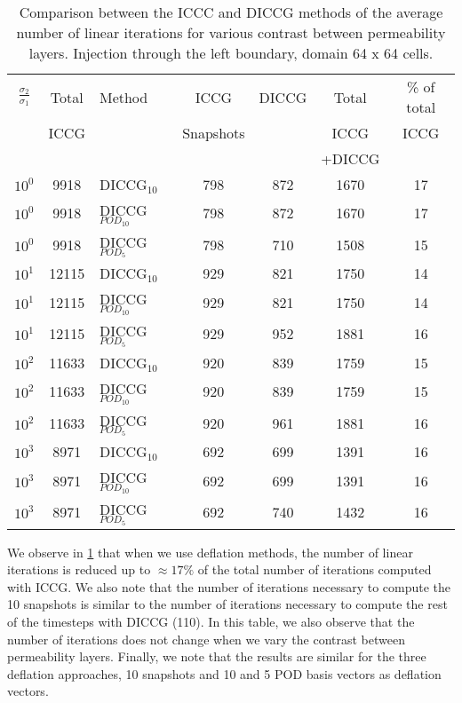 \documentclass[12pt]{article}
\begin{document}
\begin{table}[!h]\centering
\begin{minipage}{1\textwidth}
 \centering
\begin{tabular}{ ||c|c||l|c|c|c|c||} 
\hline
$\frac{\sigma_2}{\sigma_1}$&Total&Method  & ICCG&DICCG &Total&\% of total\\ 
                           & ICCG     &  & Snapshots& &ICCG& ICCG\\ 
                            &     &  & & &+DICCG& \\
\hline 
$10^{0}$ &9918& DICCG$_{10}$&798&872&1670&17\\ 
\hline  
$10^{0}$ &9918& DICCG$_{POD_{10}}$&798&872&1670&17 \\ 
\hline  
$10^{0}$ &9918& DICCG$_{POD_{5}}$&798&710&1508&15 \\ 
\hline  
$10^{1}$ &12115& DICCG$_{10}$&929&821&1750&14\\ 
\hline  
$10^{1}$ &12115& DICCG$_{POD_{10}}$&929&821&1750&14 \\ 
\hline  
$10^{1}$ &12115& DICCG$_{POD_{5}}$&929&952&1881&16 \\ 
\hline   
$10^{2}$ &11633& DICCG$_{10}$&920&839&1759&15\\ 
\hline  
$10^{2}$ &11633& DICCG$_{POD_{10}}$&920&839&1759&15 \\ 
\hline  
$10^{2}$ &11633& DICCG$_{POD_{5}}$&920&961&1881&16 \\ 
\hline  
$10^{3}$ &8971& DICCG$_{10}$&692&699&1391&16\\ 
\hline  
$10^{3}$ &8971& DICCG$_{POD_{10}}$&692&699&1391&16 \\ 
\hline  
$10^{3}$ &8971& DICCG$_{POD_{5}}$&692&740&1432&16 \\ 
\hline  
\end{tabular} 
\caption{Comparison between the ICCC and DICCG methods of the average number of linear iterations for various contrast between permeability layers. Injection through the left boundary, domain 64 x 64 cells.}\label{table:liter1} 
\end{minipage}  
\end{table}  

We observe in \ref{table:liter1} that when we use deflation methods, the number of linear iterations is reduced up to $\approx 17\%$ of the total number of iterations computed with ICCG. We also note that the number of iterations necessary to compute the 10 snapshots is similar to the number of iterations necessary to compute the rest of the timesteps with DICCG (110). In this table, we also observe that the number of iterations does not change when we vary the contrast between permeability layers. Finally, we note that the results are similar for the three deflation approaches, 10 snapshots and 10 and 5 POD basis vectors as deflation vectors. 
\end{document}
